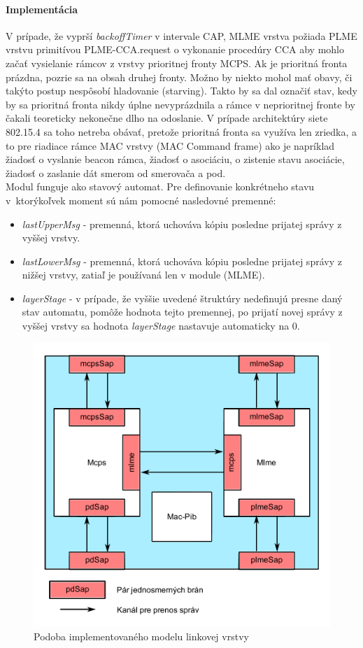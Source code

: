 \paragraph{Implementácia}
V prípade, že vyprší \textit{backoffTimer} v intervale CAP, MLME vrstva požiada PLME vrstvu primitívou PLME-CCA.request o vykonanie procedúry CCA aby mohlo začať vysielanie rámcov z vrstvy prioritnej fronty MCPS. Ak je prioritná fronta prázdna, pozrie sa na obsah druhej fronty. Možno by niekto mohol mať obavy, či takýto postup nespôsobí hladovanie (starving). Takto by sa dal označiť stav, kedy by sa prioritná fronta nikdy úplne nevyprázdnila a rámce v neprioritnej fronte by čakali teoreticky nekonečne dlho na odoslanie. V prípade architektúry siete 802.15.4 sa toho netreba obávať, pretože prioritná fronta sa využíva len zriedka, a to pre riadiace rámce MAC vrstvy (MAC Command frame) ako je napríklad žiadosť o vyslanie beacon rámca, žiadosť o asociáciu, o zistenie stavu asociácie, žiadosť o zaslanie dát smerom od smerovača a pod.\\
\indent Modul funguje ako stavový automat. Pre definovanie konkrétneho stavu v~ktorýkoľvek moment sú nám pomocné nasledovné premenné:
\begin{itemize}
\item \textit{lastUpperMsg} - premenná, ktorá uchováva kópiu posledne prijatej správy z vyššej vrstvy.
\item \textit{lastLowerMsg} - premenná, ktorá uchováva kópiu posledne prijatej správy z nižšej vrstvy, zatiaľ je používaná len v module (MLME).
\item \textit{layerStage} - v prípade, že vyššie uvedené štruktúry nedefinujú presne daný stav automatu, pomôže hodnota tejto premennej, po prijatí novej správy z vyššej vrstvy sa hodnota \textit{layerStage} nastavuje automaticky na $0$.
\end{itemize}
\begin{figure}[htbp]
\begin{center}
\includegraphics[width=120mm]{figures/architecture_mac}
\caption{Podoba implementovaného modelu linkovej vrstvy}
\label{fig:architecture_mac}
\end{center}
\end{figure}

